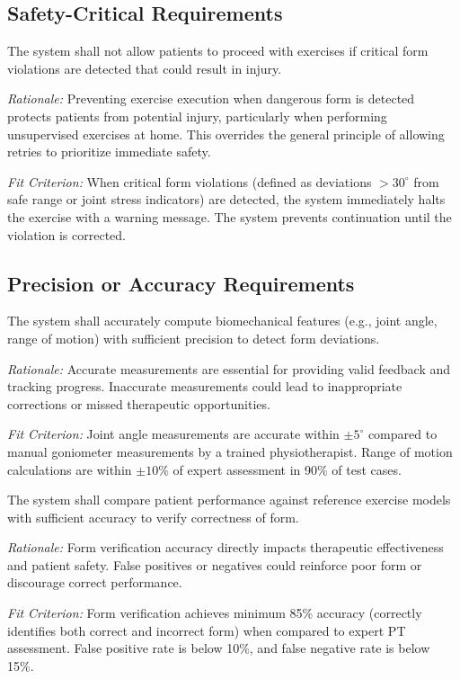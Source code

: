 \documentclass[12pt]{article}
\newcommand{\rationale}[1]{\par\emph{Rationale:} #1}
\newcommand{\fitcrit}[1]{\par\emph{Fit Criterion:} #1}
\begin{document}
\subsection{Safety-Critical Requirements}
\begin{reqlist}
	\item[PR-SCR 1.] The system shall not allow patients to proceed with exercises if critical form violations are detected that could result in injury.
	\rationale{Preventing exercise execution when dangerous form is detected protects patients from potential injury, particularly when performing unsupervised exercises at home. This overrides the general principle of allowing retries to prioritize immediate safety.}
	\fitcrit{When critical form violations (defined as deviations $>30^\circ$ from safe range or joint stress indicators) are detected, the system immediately halts the exercise with a warning message. The system prevents continuation until the violation is corrected.}
\end{reqlist}

\subsection{Precision or Accuracy Requirements}
\begin{reqlist}
	\item[PR-PAR 1.] The system shall accurately compute biomechanical features (e.g., joint angle, range of motion) with sufficient precision to detect form deviations.
	\rationale{Accurate measurements are essential for providing valid feedback and tracking progress. Inaccurate measurements could lead to inappropriate corrections or missed therapeutic opportunities.}
	\fitcrit{Joint angle measurements are accurate within $\pm5^\circ$ compared to manual goniometer measurements by a trained physiotherapist. Range of motion calculations are within $\pm10\%$ of expert assessment in 90\% of test cases.}
	
	\item[PR-PAR 2.] The system shall compare patient performance against reference exercise models with sufficient accuracy to verify correctness of form.
	\rationale{Form verification accuracy directly impacts therapeutic effectiveness and patient safety. False positives or negatives could reinforce poor form or discourage correct performance.}
	\fitcrit{Form verification achieves minimum 85\% accuracy (correctly identifies both correct and incorrect form) when compared to expert PT assessment. False positive rate is below 10\%, and false negative rate is below 15\%.}
\end{reqlist}
\end{document}
